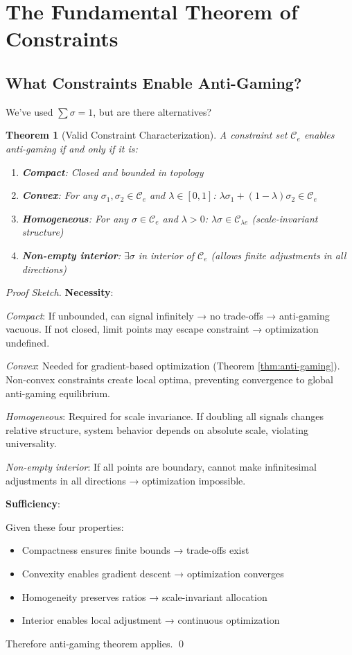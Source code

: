 \documentclass[11pt,a4paper]{article}
\newtheorem{theorem}{Theorem}[section]
\theoremstyle{definition}
\theoremstyle{remark}
\newcommand{\C}{\mathcal{C}}
\begin{document}
\section{The Fundamental Theorem of Constraints}
\label{sec:constraint-theorem}

\subsection{What Constraints Enable Anti-Gaming?}

We've used $\sum \sigma = 1$, but are there alternatives?

\begin{theorem}[Valid Constraint Characterization]
A constraint set $\C_e$ enables anti-gaming if and only if it is:
\begin{enumerate}
\item \textbf{Compact}: Closed and bounded in topology
\item \textbf{Convex}: For any $\sigma_1, \sigma_2 \in \C_e$ and $\lambda \in [0,1]$: $\lambda\sigma_1 + (1-\lambda)\sigma_2 \in \C_e$
\item \textbf{Homogeneous}: For any $\sigma \in \C_e$ and $\lambda > 0$: $\lambda\sigma \in \C_{\lambda e}$ (scale-invariant structure)
\item \textbf{Non-empty interior}: $\exists \sigma$ in interior of $\C_e$ (allows finite adjustments in all directions)
\end{enumerate}
\end{theorem}

\begin{proof}[Proof Sketch]
\textbf{Necessity}:

\textit{Compact}: If unbounded, can signal infinitely → no trade-offs → anti-gaming vacuous. If not closed, limit points may escape constraint → optimization undefined.

\textit{Convex}: Needed for gradient-based optimization (Theorem \ref{thm:anti-gaming}). Non-convex constraints create local optima, preventing convergence to global anti-gaming equilibrium.

\textit{Homogeneous}: Required for scale invariance. If doubling all signals changes relative structure, system behavior depends on absolute scale, violating universality.

\textit{Non-empty interior}: If all points are boundary, cannot make infinitesimal adjustments in all directions → optimization impossible.

\textbf{Sufficiency}:

Given these four properties:
\begin{itemize}
\item Compactness ensures finite bounds → trade-offs exist
\item Convexity enables gradient descent → optimization converges
\item Homogeneity preserves ratios → scale-invariant allocation
\item Interior enables local adjustment → continuous optimization
\end{itemize}

Therefore anti-gaming theorem applies. \qed
\end{proof}
\end{document}
